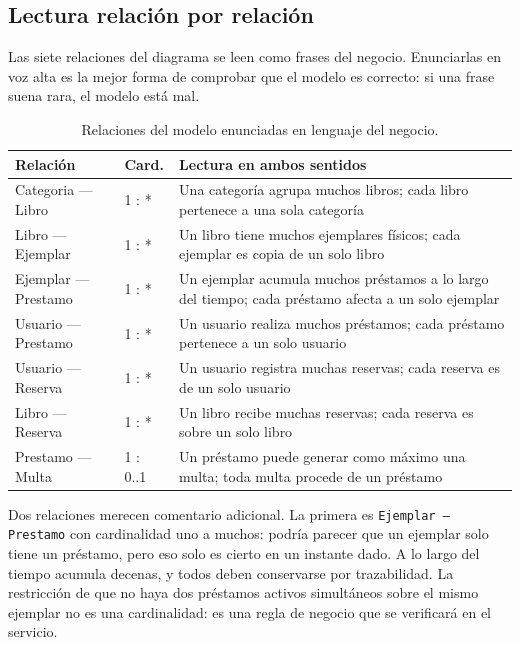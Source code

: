 \documentclass[11pt,a4paper,openany]{book}
\begin{document}
\subsection{Lectura relación por relación}
\label{sec:relaciones}

Las siete relaciones del diagrama se leen como frases del negocio. Enunciarlas en voz alta es la mejor forma de comprobar que el modelo es correcto: si una frase suena rara, el modelo está mal.

\begin{table}[htbp]
	\centering
	\caption{Relaciones del modelo enunciadas en lenguaje del negocio.}
	\label{tab:relaciones}
	\small
	\begin{tabularx}{\textwidth}{L{3.9cm} L{1.5cm} X}
		\toprule
		\textbf{Relación} & \textbf{Card.} & \textbf{Lectura en ambos sentidos} \\
		\midrule
		Categoria --- Libro & 1 : * & Una categoría agrupa muchos libros; cada libro pertenece a una sola categoría \\
		Libro --- Ejemplar & 1 : * & Un libro tiene muchos ejemplares físicos; cada ejemplar es copia de un solo libro \\
		Ejemplar --- Prestamo & 1 : * & Un ejemplar acumula muchos préstamos a lo largo del tiempo; cada préstamo afecta a un solo ejemplar \\
		Usuario --- Prestamo & 1 : * & Un usuario realiza muchos préstamos; cada préstamo pertenece a un solo usuario \\
		Usuario --- Reserva & 1 : * & Un usuario registra muchas reservas; cada reserva es de un solo usuario \\
		Libro --- Reserva & 1 : * & Un libro recibe muchas reservas; cada reserva es sobre un solo libro \\
		Prestamo --- Multa & 1 : 0..1 & Un préstamo puede generar como máximo una multa; toda multa procede de un préstamo \\
		\bottomrule
	\end{tabularx}
\end{table}

Dos relaciones merecen comentario adicional. La primera es \texttt{Ejemplar --- Prestamo} con cardinalidad uno a muchos: podría parecer que un ejemplar solo tiene un préstamo, pero eso solo es cierto en un instante dado. A lo largo del tiempo acumula decenas, y todos deben conservarse por trazabilidad. La restricción de que no haya dos préstamos activos simultáneos sobre el mismo ejemplar no es una cardinalidad: es una regla de negocio que se verificará en el servicio.
\end{document}
